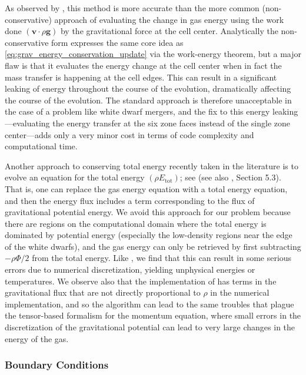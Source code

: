 \documentclass[12pt]{article}
\begin{document}
As observed by \cite{arepo}, this method is more accurate than the more common (non-conservative) approach
of evaluating the change in gas energy using the work done $(\mathbf{v} \cdot \rho \mathbf{g})$
by the gravitational force at the cell center. Analytically the non-conservative form expresses the same core idea as
\autoref{eq:grav_energy_conservation_update} via the work-energy theorem, but a major flaw is that
it evaluates the energy change at the cell center when in fact the mass transfer is happening at
the cell edges. This can result in a significant leaking of energy throughout the course of the
evolution, dramatically affecting the course of the evolution. The standard approach is therefore
unacceptable in the case of a problem like white dwarf mergers, and the fix to this energy
leaking---evaluating the energy transfer at the six zone faces instead of the single zone
center---adds only a very minor cost in terms of code complexity and computational time.

Another approach to conserving total energy recently taken in the literature is to evolve an
equation for the total energy $(\rho E_{\text{tot}})$; see \cite{jiang:2013} (see also
\cite{arepo}, Section 5.3). That is, one can replace the gas energy equation with a total energy equation,
and then the energy flux includes a term corresponding to the flux of gravitational potential energy. We
avoid this approach for our problem because there are regions on the computational domain where the total
energy is dominated by potential energy (especially the low-density regions near the edge of the white dwarfs),
and the gas energy can only be retrieved by first subtracting $-\rho \Phi/2$ from the total energy. Like
\cite{arepo}, we find that this can result in some serious errors due to numerical discretization, yielding
unphysical energies or temperatures. We observe also that the implementation of \cite{jiang:2013}
has terms in the gravitational flux that are not directly proportional to $\rho$ in the numerical implementation,
and so the algorithm can lead to the same troubles that plague the tensor-based formalism for the momentum equation, where small errors
in the discretization of the gravitational potential can lead to very large changes in the energy of the gas.

\subsubsection{Boundary Conditions}
\label{sec:gravity_boundary_conditions}
\end{document}
